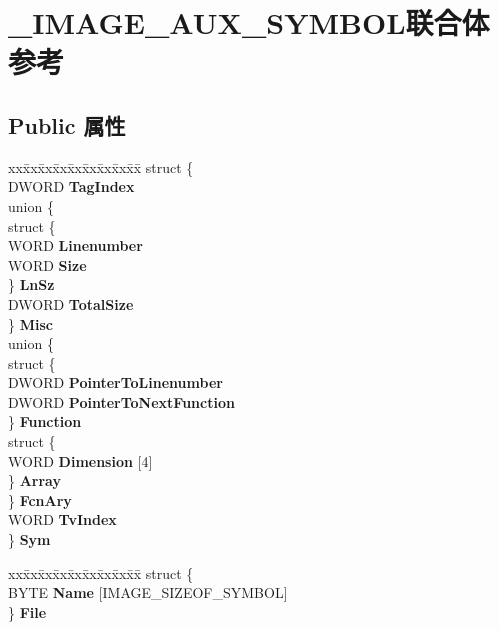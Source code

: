\hypertarget{union___i_m_a_g_e___a_u_x___s_y_m_b_o_l}{}\section{\+\_\+\+I\+M\+A\+G\+E\+\_\+\+A\+U\+X\+\_\+\+S\+Y\+M\+B\+O\+L联合体 参考}
\label{union___i_m_a_g_e___a_u_x___s_y_m_b_o_l}
\subsection*{Public 属性}
\begin{DoxyCompactItemize}
\item 
\mbox{\label{union___i_m_a_g_e___a_u_x___s_y_m_b_o_l_af4592ce4c233edf981651b5d61fc2a56}} 
\begin{tabbing}
xx\=xx\=xx\=xx\=xx\=xx\=xx\=xx\=xx\=\kill
struct \{\\
\>DWORD {\bfseries TagIndex}\\
\>union \{\\
\>\>struct \{\\
\>\>\>WORD {\bfseries Linenumber}\\
\>\>\>WORD {\bfseries Size}\\
\>\>\} {\bfseries LnSz}\\
\>\>DWORD {\bfseries TotalSize}\\
\>\} {\bfseries Misc}\\
\>union \{\\
\>\>struct \{\\
\>\>\>DWORD {\bfseries PointerToLinenumber}\\
\>\>\>DWORD {\bfseries PointerToNextFunction}\\
\>\>\} {\bfseries Function}\\
\>\>struct \{\\
\>\>\>WORD {\bfseries Dimension} \mbox{[}4\mbox{]}\\
\>\>\} {\bfseries Array}\\
\>\} {\bfseries FcnAry}\\
\>WORD {\bfseries TvIndex}\\
\} {\bfseries Sym}\\

\end{tabbing}\item 
\mbox{\label{union___i_m_a_g_e___a_u_x___s_y_m_b_o_l_aa840943753a6283116b7c19ad66e80a6}} 
\begin{tabbing}
xx\=xx\=xx\=xx\=xx\=xx\=xx\=xx\=xx\=\kill
struct \{\\
\>BYTE {\bfseries Name} \mbox{[}IMAGE\_SIZEOF\_SYMBOL\mbox{]}\\
\} {\bfseries File}\\


\end{tabbing}
\end{DoxyCompactItemize}
